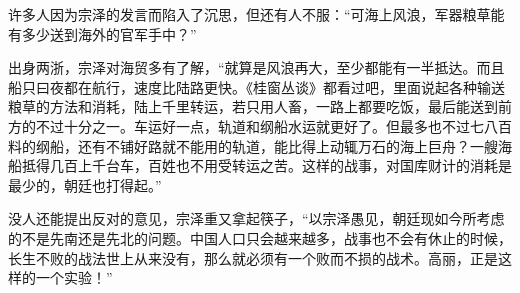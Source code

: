 许多人因为宗泽的发言而陷入了沉思，但还有人不服：“可海上风浪，军器粮草能有多少送到海外的官军手中？”

出身两浙，宗泽对海贸多有了解，“就算是风浪再大，至少都能有一半抵达。而且船只曰夜都在航行，速度比陆路更快。《桂窗丛谈》都看过吧，里面说起各种输送粮草的方法和消耗，陆上千里转运，若只用人畜，一路上都要吃饭，最后能送到前方的不过十分之一。车运好一点，轨道和纲船水运就更好了。但最多也不过七八百料的纲船，还有不铺好路就不能用的轨道，能比得上动辄万石的海上巨舟？一艘海船抵得几百上千台车，百姓也不用受转运之苦。这样的战事，对国库财计的消耗是最少的，朝廷也打得起。”

没人还能提出反对的意见，宗泽重又拿起筷子，“以宗泽愚见，朝廷现如今所考虑的不是先南还是先北的问题。中国人口只会越来越多，战事也不会有休止的时候，长生不败的战法世上从来没有，那么就必须有一个败而不损的战术。高丽，正是这样的一个实验！”

